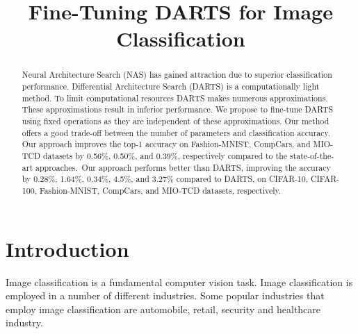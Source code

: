 \documentclass[10pt,a4paper,conference]{IEEEtran}
\begin{document}
\title{Fine-Tuning DARTS for Image Classification}
\author{
\and
{}
\and
{}
}
\maketitle

\begin{abstract}
Neural Architecture Search (NAS) has gained attraction due to superior classification performance. Differential Architecture Search (DARTS) is a computationally light method. To limit computational resources DARTS makes numerous approximations. These approximations result in inferior performance. We propose to fine-tune DARTS using fixed operations as they are independent of these approximations. Our method offers a good trade-off between the number of parameters and classification accuracy. Our approach improves the top-1 accuracy on Fashion-MNIST, CompCars, and MIO-TCD datasets by 0.56\%, 0.50\%, and 0.39\%, respectively compared to the state-of-the-art approaches.\ Our approach performs better than DARTS, improving the accuracy by 0.28\%, 1.64\%, 0.34\%, 4.5\%, and 3.27\% compared to DARTS, on CIFAR-10, CIFAR-100, Fashion-MNIST, CompCars, and MIO-TCD datasets, respectively.
\end{abstract}

\IEEEpeerreviewmaketitle



\section{Introduction}
\label{Introduction}
Image classification is a fundamental computer vision task. Image classification is employed in a number of different industries. Some popular industries that employ image classification are automobile, retail, security and healthcare industry.
\end{document}
